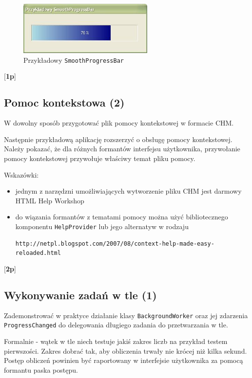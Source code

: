 	\begin{figure}
	\begin{center}
	\includegraphics[width=0.6\textwidth]{z6_pb}
	\end{center}
	\caption{Przykładowy {\tt SmoothProgressBar}}
	\end{figure}
      
      [{\bf 1p}]  
	        
\subsection{Pomoc kontekstowa (2)}

    W dowolny sposób przygotować plik pomocy kontekstowej w formacie CHM. 
\label{pomoc_kontekstowa}	
    
    Następnie przykładową aplikację rozszerzyć o obsługę
    pomocy kontekstowej. Należy pokazać, że dla różnych formantów 
    interfejsu użytkownika, przywołanie pomocy kontekstowej przywołuje
    właściwy temat pliku pomocy.
    
    Wskazówki: 
	
	\begin{itemize}
	\item jednym z narzędzni umożliwiających wytworzenie pliku CHM jest darmowy HTML Help Workshop
	\item do wiązania formantów z tematami pomocy można
    użyć bibliotecznego komponentu {\tt HelpProvider} lub jego alternatyw
    w rodzaju 
	
	{\tt http://netpl.blogspot.com/2007/08/con\-text-help-made-easy-reloaded.html}
	\end{itemize}
    
    [{\bf 2p}]  

\subsection{Wykonywanie zadań w tle (1)}

	Zademonstrować w praktyce działanie klasy {\tt BackgroundWorker} oraz jej zdarzenia {\tt ProgressChanged} do delegowania długiego zadania
	do przetwarzania w tle. 
	
	Formalnie - wątek w tle niech testuje jakiś zakres liczb na przykład testem pierwszości. Zakres dobrać tak, aby obliczenia trwały nie krócej niż kilka sekund.
	Postęp obliczeń powinien być raportowany w interfejsie użytkownika za pomocą formantu paska postępu.
	
